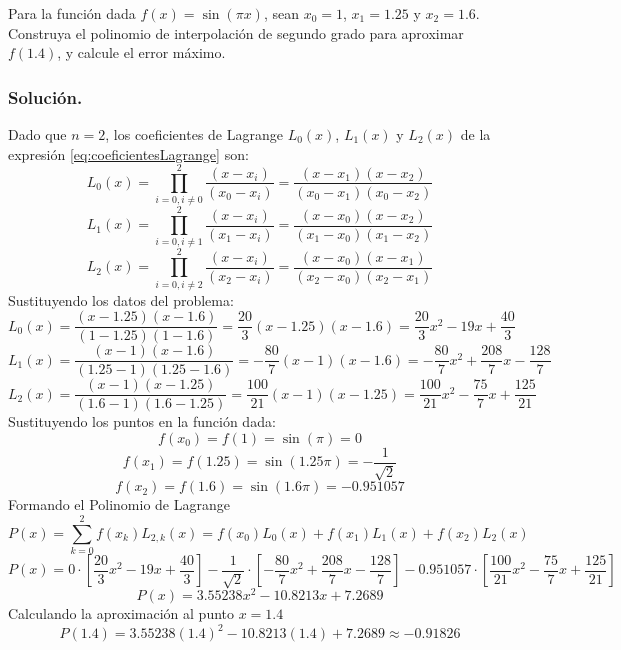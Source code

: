 \begin{exerciseT}
Para la función dada $f(x) = \sin (\pi x)$, sean $x_0=1$, $x_1=1.25$ y $x_2=1.6$. Construya el polinomio de interpolación 
de segundo grado para aproximar $f(1.4)$, y calcule el error máximo.\\
	\subsubsection*{Solución.} Dado que $n=2$, los coeficientes de Lagrange $L_0(x)$, $L_1(x)$ y $L_2(x)$ de la expresión \ref{eq:coeficientesLagrange} son:
			$$L_0(x) = \prod_{i=0, i\not= 0}^{2} \dfrac{(x-x_i)}{(x_0 - x_i)} = \dfrac{(x-x_1)(x-x_2)}{(x_0-x_1)(x_0-x_2)}$$	
			$$L_1(x) = \prod_{i=0, i\not= 1}^{2} \dfrac{(x-x_i)}{(x_1 - x_i)} = \dfrac{(x-x_0)(x-x_2)}{(x_1-x_0)(x_1-x_2)}$$	
			$$L_2(x) = \prod_{i=0, i\not= 2}^{2} \dfrac{(x-x_i)}{(x_2 - x_i)} = \dfrac{(x-x_0)(x-x_1)}{(x_2-x_0)(x_2-x_1)}$$	
		Sustituyendo los datos del problema:
			$$L_0(x) = \dfrac{(x-1.25)(x-1.6)}{(1-1.25)(1-1.6)} = \frac{20}{3}(x-1.25)(x-1.6) = \frac{20}{3}x^2 - 19x + \frac{40}{3}$$
			$$L_1(x) = \dfrac{(x-1)(x-1.6)}{(1.25-1)(1.25-1.6)} = -\frac{80}{7}(x-1)(x-1.6) = -\frac{80}{7}x^2 + \frac{208}{7}x - \frac{128}{7}$$
			$$L_2(x) = \dfrac{(x-1)(x-1.25)}{(1.6-1)(1.6-1.25)} = \frac{100}{21}(x-1)(x-1.25) = \frac{100}{21}x^2 - \frac{75}{7}x + \frac{125}{21}$$
		Sustituyendo los puntos en la función dada:
			$$f(x_0) = f(1) = \sin (\pi) = 0$$
			$$f(x_1) = f(1.25) = \sin (1.25\pi) = -\frac{1}{\sqrt{2}}$$
			$$f(x_2) = f(1.6) = \sin (1.6\pi) = -0.951057$$
		Formando el Polinomio de Lagrange
			$$P(x) = \sum_{k=0}^2 f(x_k)L_{2,k}(x) = f(x_0)L_0(x) + f(x_1)L_1(x) + f(x_2)L_2(x)$$
			$$P(x) = 0\cdot \left[ \frac{20}{3}x^2 - 19x + \frac{40}{3} \right] - \frac{1}{\sqrt{2}}\cdot \left[-\frac{80}{7}x^2 + \frac{208}{7}x 
			- \frac{128}{7}\right]
			-0.951057\cdot \left[ \frac{100}{21}x^2 - \frac{75}{7}x + \frac{125}{21} \right]$$
			$$P(x) = 3.55238x^2 - 10.8213x + 7.2689$$
		Calculando la aproximación al punto $x=1.4$
			$$P(1.4) = 3.55238(1.4)^2 - 10.8213(1.4) + 7.2689 \approx -0.91826$$
\end{exerciseT}

